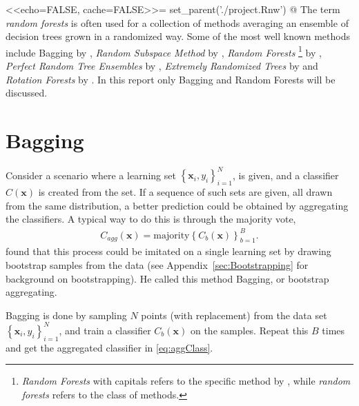 <<echo=FALSE, cache=FALSE>>=
set_parent('./project.Rnw')
@
The term \textit{random forests} is often used for a collection of methods averaging an ensemble of decision trees grown in a randomized way. 
Some of the most well known methods include Bagging by \cite{Breiman1996}, \textit{Random Subspace Method} by \cite{ho1998random}, 
\textit{Random Forests} \footnote{\textit{Random Forests} with capitals refers to the specific method by \cite{randomforests}, while \textit{random forests} refers to the class of methods.} by \cite{randomforests},
\textit{Perfect Random Tree Ensembles} by \cite{cutler2001pert}, \textit{Extremely Randomized Trees} by \cite{Geurts2006} and \textit{Rotation Forests} by \cite{Rodriguez2006}. 
In this report only Bagging and Random Forests will be discussed.

\section{Bagging}
\label{sec:Bagging}
Consider a scenario where a learning set $\left\{ \mathbf{x}_i, y_i \right\}_{i=1}^{N}$, is given, and a classifier $C(\mathbf{x})$ is created from the set. If a sequence of such sets are given, all drawn from the same distribution, a better prediction could be obtained by aggregating the classifiers. A typical way to do this is through the majority vote,
\begin{align}
  \label{eq:aggClass} 
  C_{agg}(\mathbf{x}) = \mathrm{majority} \left\{ C_b(\mathbf{x}) \right\}_{b=1}^{B}.
\end{align}
\cite{Breiman1996} found that this process could be imitated on a single learning set by drawing bootstrap samples from the data (see Appendix~\ref{sec:Bootstrapping} for background on bootstrapping). He called this method Bagging, or bootstrap aggregating. 

Bagging is done by sampling $N$ points (with replacement) from the data set $\left\{ \mathbf{x}_i, y_i \right\}_{i=1}^{N}$, and train a classifier $C_b(\mathbf{x})$ on the samples. Repeat this $B$ times and get the aggregated classifier in  \eqref{eq:aggClass}. 

